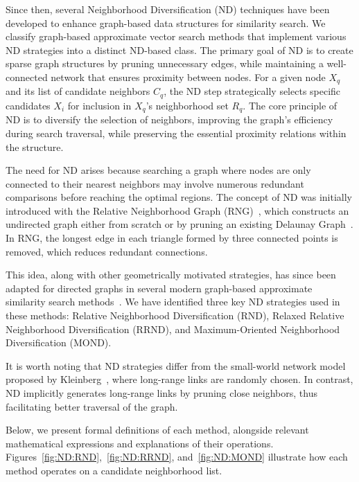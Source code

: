 Since then, several Neighborhood Diversification (ND) techniques have been developed to enhance graph-based data structures for similarity search. We classify graph-based approximate vector search methods that implement various ND strategies into a distinct ND-based class. The primary goal of ND is to create sparse graph structures by pruning unnecessary edges, while maintaining a well-connected network that ensures proximity between nodes. For a given node \( X_q \) and its list of candidate neighbors \( C_q \), the ND step strategically selects specific candidates \( X_i \) for inclusion in \( X_q \)’s neighborhood set \( R_q \). The core principle of ND is to diversify the selection of neighbors, improving the graph's efficiency during search traversal, while preserving the essential proximity relations within the structure.

The need for ND arises because searching a graph where nodes are only connected to their nearest neighbors may involve numerous redundant comparisons before reaching the optimal regions. The concept of ND was initially introduced with the Relative Neighborhood Graph (RNG)~\citep{rng,toussaint02}, which constructs an undirected graph either from scratch or by pruning an existing Delaunay Graph~\cite{dobkin1990delaunay}. In RNG, the longest edge in each triangle formed by three connected points is removed, which reduces redundant connections.

This idea, along with other geometrically motivated strategies, has since been adapted for directed graphs in several modern graph-based approximate similarity search methods~\citep{hnsw,dpg,nsg,nssg,vamana,SPTAG4,elpis}. We have identified three key ND strategies used in these methods: Relative Neighborhood Diversification (RND), Relaxed Relative Neighborhood Diversification (RRND), and Maximum-Oriented Neighborhood Diversification (MOND). 

It is worth noting that ND strategies differ from the small-world network model proposed by Kleinberg~\cite{kleinberg2000, kleinberg2002}, where long-range links are randomly chosen. In contrast, ND implicitly generates long-range links by pruning close neighbors, thus facilitating better traversal of the graph.

Below, we present formal definitions of each method, alongside relevant mathematical expressions and explanations of their operations. Figures~\ref{fig:ND:RND},~\ref{fig:ND:RRND}, and~\ref{fig:ND:MOND} illustrate how each method operates on a candidate neighborhood list.


